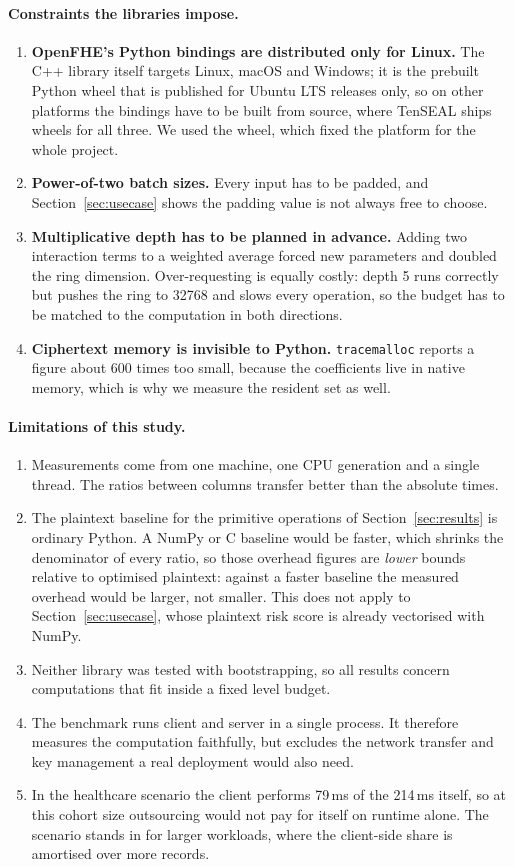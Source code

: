 \documentclass[11pt,a4paper]{article}
\begin{document}
\paragraph{Constraints the libraries impose.}
\begin{enumerate}
\item \textbf{OpenFHE's Python bindings are distributed only for Linux.} The C++
library itself targets Linux, macOS and Windows; it is the prebuilt Python wheel
that is published for Ubuntu LTS releases only, so on other platforms the bindings
have to be built from source, where TenSEAL ships wheels for all three. We used the
wheel, which fixed the platform for the whole project.
\item \textbf{Power-of-two batch sizes.} Every input has to be padded, and
Section~\ref{sec:usecase} shows the padding value is not always free to choose.
\item \textbf{Multiplicative depth has to be planned in advance.} Adding two
interaction terms to a weighted average forced new parameters and doubled the ring
dimension. Over-requesting is equally costly: depth 5 runs correctly but pushes the
ring to 32768 and slows every operation, so the budget has to be matched to the
computation in both directions.
\item \textbf{Ciphertext memory is invisible to Python.} \texttt{tracemalloc}
reports a figure about 600 times too small, because the coefficients live in native
memory, which is why we measure the resident set as well.
\end{enumerate}

\paragraph{Limitations of this study.}
\begin{enumerate}
\item Measurements come from one machine, one CPU generation and a single thread. The
ratios between columns transfer better than the absolute times.
\item The plaintext baseline for the primitive operations of
Section~\ref{sec:results} is ordinary Python. A NumPy or C baseline would be faster,
which shrinks the denominator of every ratio, so those overhead figures are
\emph{lower} bounds relative to optimised plaintext: against a faster baseline the
measured overhead would be larger, not smaller. This does not apply to
Section~\ref{sec:usecase}, whose plaintext risk score is already vectorised with
NumPy.
\item Neither library was tested with bootstrapping, so all results concern
computations that fit inside a fixed level budget.
\item The benchmark runs client and server in a single process. It therefore
measures the computation faithfully, but excludes the network transfer and key
management a real deployment would also need.
\item In the healthcare scenario the client performs 79\,ms of the 214\,ms itself,
so at this cohort size outsourcing would not pay for itself on runtime alone. The
scenario stands in for larger workloads, where the client-side share is amortised
over more records.
\end{enumerate}
\end{document}
